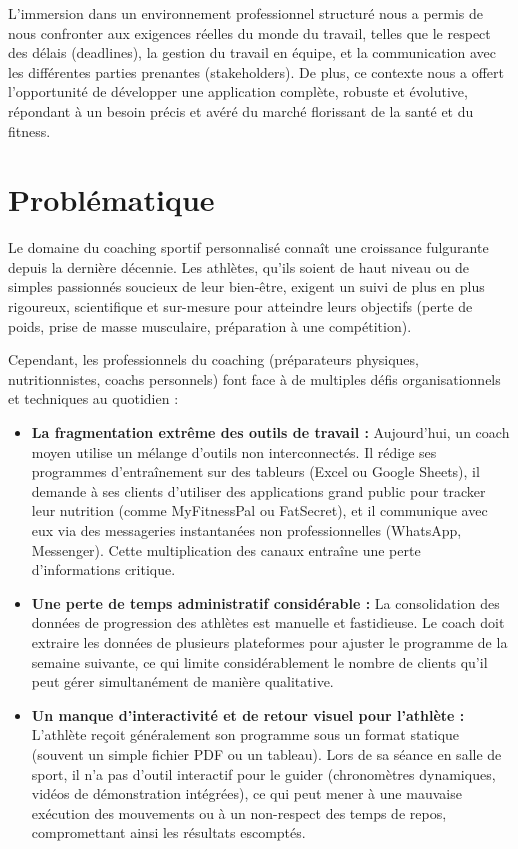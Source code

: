 L'immersion dans un environnement professionnel structuré nous a permis de nous confronter aux exigences réelles du monde du travail, telles que le respect des délais (deadlines), la gestion du travail en équipe, et la communication avec les différentes parties prenantes (stakeholders). De plus, ce contexte nous a offert l'opportunité de développer une application complète, robuste et évolutive, répondant à un besoin précis et avéré du marché florissant de la santé et du fitness.

\section{Problématique}
Le domaine du coaching sportif personnalisé connaît une croissance fulgurante depuis la dernière décennie. Les athlètes, qu'ils soient de haut niveau ou de simples passionnés soucieux de leur bien-être, exigent un suivi de plus en plus rigoureux, scientifique et sur-mesure pour atteindre leurs objectifs (perte de poids, prise de masse musculaire, préparation à une compétition). 

Cependant, les professionnels du coaching (préparateurs physiques, nutritionnistes, coachs personnels) font face à de multiples défis organisationnels et techniques au quotidien :

\begin{itemize}
    \item \textbf{La fragmentation extrême des outils de travail :} Aujourd'hui, un coach moyen utilise un mélange d'outils non interconnectés. Il rédige ses programmes d'entraînement sur des tableurs (Excel ou Google Sheets), il demande à ses clients d'utiliser des applications grand public pour tracker leur nutrition (comme MyFitnessPal ou FatSecret), et il communique avec eux via des messageries instantanées non professionnelles (WhatsApp, Messenger). Cette multiplication des canaux entraîne une perte d'informations critique.
    \item \textbf{Une perte de temps administratif considérable :} La consolidation des données de progression des athlètes est manuelle et fastidieuse. Le coach doit extraire les données de plusieurs plateformes pour ajuster le programme de la semaine suivante, ce qui limite considérablement le nombre de clients qu'il peut gérer simultanément de manière qualitative.
    \item \textbf{Un manque d'interactivité et de retour visuel pour l'athlète :} L'athlète reçoit généralement son programme sous un format statique (souvent un simple fichier PDF ou un tableau). Lors de sa séance en salle de sport, il n'a pas d'outil interactif pour le guider (chronomètres dynamiques, vidéos de démonstration intégrées), ce qui peut mener à une mauvaise exécution des mouvements ou à un non-respect des temps de repos, compromettant ainsi les résultats escomptés.
\end{itemize}

